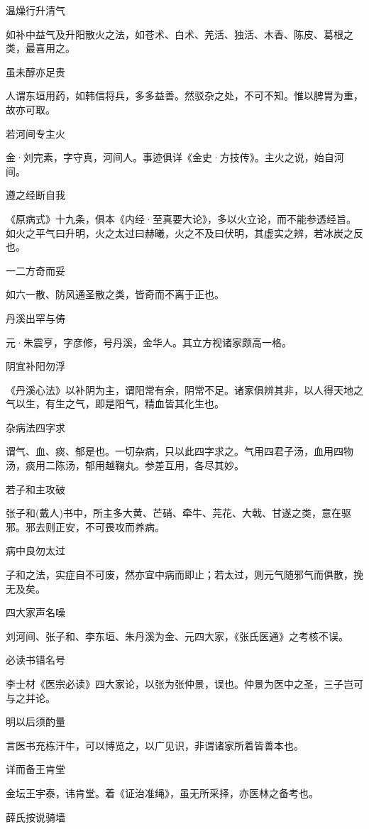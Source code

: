 \documentclass[a4paper,12pt,UTF8,twoside]{ctexbook}
\begin{document}
	温燥行升清气
	
	如补中益气及升阳散火之法，如苍术、白术、羌活、独活、木香、陈皮、葛根之类，最喜用之。
	
	虽未醇亦足贵
	
	人谓东垣用药，如韩信将兵，多多益善。然驳杂之处，不可不知。惟以脾胃为重，故亦可取。
	
	若河间专主火
	
	金·刘完素，字守真，河间人。事迹俱详《金史·方技传》。主火之说，始自河间。
	
	遵之经断自我
	
	《原病式》十九条，俱本《内经·至真要大论》，多以火立论，而不能参透经旨。如火之平气曰升明，火之太过曰赫曦，火之不及曰伏明，其虚实之辨，若冰炭之反也。
	
	一二方奇而妥
	
	如六一散、防风通圣散之类，皆奇而不离于正也。
	
	丹溪出罕与俦
	
	元·朱震亨，字彦修，号丹溪，金华人。其立方视诸家颇高一格。
	
	阴宜补阳勿浮
	
	《丹溪心法》以补阴为主，谓阳常有余，阴常不足。诸家俱辨其非，以人得天地之气以生，有生之气，即是阳气，精血皆其化生也。
	
	杂病法四字求
	
	谓气、血、痰、郁是也。一切杂病，只以此四字求之。气用四君子汤，血用四物汤，痰用二陈汤，郁用越鞠丸。参差互用，各尽其妙。
	
	若子和主攻破
	
	张子和(戴人)书中，所主多大黄、芒硝、牵牛、芫花、大戟、甘遂之类，意在驱邪。邪去则正安，不可畏攻而养病。
	
	病中良勿太过
	
	子和之法，实症自不可废，然亦宜中病而即止；若太过，则元气随邪气而俱散，挽无及矣。
	
	四大家声名噪
	
	刘河间、张子和、李东垣、朱丹溪为金、元四大家，《张氏医通》之考核不误。
	
	必读书错名号
	
	李士材《医宗必读》四大家论，以张为张仲景，误也。仲景为医中之圣，三子岂可与之并论。
	
	明以后须酌量
	
	言医书充栋汗牛，可以博览之，以广见识，非谓诸家所着皆善本也。
	
	详而备王肯堂
	
	金坛王宇泰，讳肯堂。着《证治准绳》，虽无所采择，亦医林之备考也。
	
	薛氏按说骑墙
	
\end{document}
